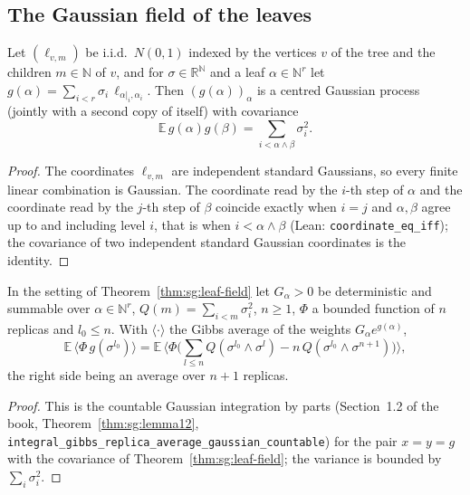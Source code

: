\subsection*{The Gaussian field of the leaves}

\begin{theorem}\label{thm:sg:leaf-field}
  \leanok
Let $(\ell_{v,m})$ be i.i.d.\ $N(0,1)$ indexed by the vertices $v$ of the tree and the children $m\in\mathbb N$ of $v$, and for $\sigma\in\mathbb R^{\mathbb N}$ and a leaf
$\alpha\in\mathbb N^r$ let $g(\alpha)=\sum_{i<r}\sigma_i\,\ell_{\alpha|_i,\alpha_i}$. Then $(g(\alpha))_\alpha$ is a centred Gaussian process (jointly with a second copy of itself) with covariance
\[
 \mathbb E\,g(\alpha)g(\beta)=\sum_{i<\alpha\wedge\beta}\sigma_i^2 .
\]
\end{theorem}
\begin{proof}
  \leanok
The coordinates $\ell_{v,m}$ are independent standard Gaussians, so every finite linear combination is Gaussian. The coordinate read by the $i$-th step of $\alpha$ and the coordinate read by the
$j$-th step of $\beta$ coincide exactly when $i=j$ and $\alpha,\beta$ agree up to and including level $i$, that is when $i<\alpha\wedge\beta$ (Lean: \texttt{coordinate\_eq\_iff}); the covariance of
two independent standard Gaussian coordinates is the identity.
\end{proof}

\begin{theorem}\label{thm:sg:leaf-ibp}
  \leanok
In the setting of Theorem~\ref{thm:sg:leaf-field} let $G_\alpha>0$ be deterministic and summable over $\alpha\in\mathbb N^r$, $Q(m)=\sum_{i<m}\sigma_i^2$, $n\ge1$,
$\Phi$ a bounded function of $n$ replicas and $l_0\le n$. With $\langle\cdot\rangle$ the Gibbs average of the weights $G_\alpha e^{g(\alpha)}$,
\[
 \mathbb E\,\langle\Phi\, g(\sigma^{l_0})\rangle=\mathbb E\,\Big\langle\Phi\Big(\sum_{l\le n}Q(\sigma^{l_0}\wedge\sigma^l)-n\,Q(\sigma^{l_0}\wedge\sigma^{n+1})\Big)\Big\rangle ,
\]
the right side being an average over $n+1$ replicas.
\end{theorem}
\begin{proof}
  \leanok
This is the countable Gaussian integration by parts (Section~1.2 of the book, Theorem~\ref{thm:sg:lemma12}, \texttt{integral\_gibbs\_replica\_average\_gaussian\_countable}) for the pair $x=y=g$ with the covariance of
Theorem~\ref{thm:sg:leaf-field}; the variance is bounded by $\sum_i\sigma_i^2$.
\end{proof}

